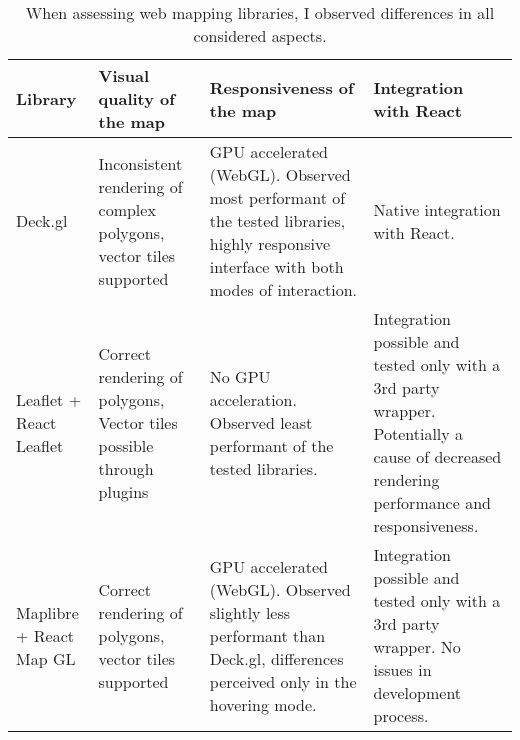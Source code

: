 \begin{table}[H]
	\caption{
		When assessing web mapping libraries,
		I observed differences in all considered aspects.
	}
	\label{tab:map library comparison}
	\centering
	\begin{tabular}{ | L{0.13\textwidth} | L{0.25\textwidth} | L{0.25\textwidth} | L{0.25\textwidth} | }
		\hline
		\textbf{Library}
		& \textbf{Visual quality of the map}
		& \textbf{Responsiveness of the map}
		& \textbf{Integration with React}
		\\
		\hline
		\hline
		Deck.gl
		& Inconsistent rendering of complex polygons, vector tiles supported
		& GPU accelerated (WebGL).
		Observed most performant of the tested libraries,
		highly responsive interface with both modes of interaction.
		& Native integration with React.
		\\
		\hline
		Leaflet + React Leaflet
		& Correct rendering of polygons, Vector tiles possible through plugins
		& No GPU acceleration.
		Observed least performant of the tested libraries.
		& Integration possible and tested only with a 3rd party wrapper.
		Potentially a cause of decreased rendering performance and responsiveness.
		\\
		\hline
		Maplibre + React Map GL
		& Correct rendering of polygons, vector tiles supported
		& GPU accelerated (WebGL).
		Observed slightly less performant than Deck.gl,
		differences perceived only in the hovering mode.
		& Integration possible and tested only with a 3rd party wrapper.
		No issues in development process.
		\\
		\hline
	\end{tabular}
\end{table}
